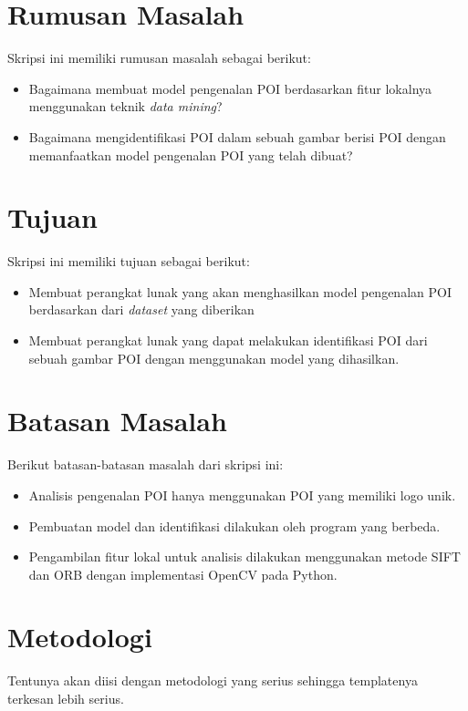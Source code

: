 \section{Rumusan Masalah}
\label{sec:rumusan}
Skripsi ini memiliki rumusan masalah sebagai berikut:
\begin{itemize}
	\item Bagaimana membuat model pengenalan POI berdasarkan fitur lokalnya menggunakan teknik \textit{data mining}?
	\item Bagaimana mengidentifikasi POI dalam sebuah gambar berisi POI dengan memanfaatkan model pengenalan POI yang telah dibuat?
\end{itemize}

\section{Tujuan}
\label{sec:tujuan}
Skripsi ini memiliki tujuan sebagai berikut:
\begin{itemize}
	\item Membuat perangkat lunak yang akan menghasilkan model pengenalan POI berdasarkan dari \textit{dataset} yang diberikan
	\item Membuat perangkat lunak yang dapat melakukan identifikasi POI dari sebuah gambar POI dengan menggunakan model yang dihasilkan.
\end{itemize}

\section{Batasan Masalah}
\label{sec:batasan}
Berikut batasan-batasan masalah dari skripsi ini:
\begin{itemize}
	\item Analisis pengenalan POI hanya menggunakan POI yang memiliki logo unik.
	\item Pembuatan model dan identifikasi dilakukan oleh program yang berbeda.
	\item Pengambilan fitur lokal untuk analisis dilakukan menggunakan metode SIFT dan ORB dengan implementasi OpenCV pada Python.
\end{itemize}

\section{Metodologi}
\label{sec:metlit}
Tentunya akan diisi dengan metodologi yang serius sehingga templatenya terkesan lebih serius.

